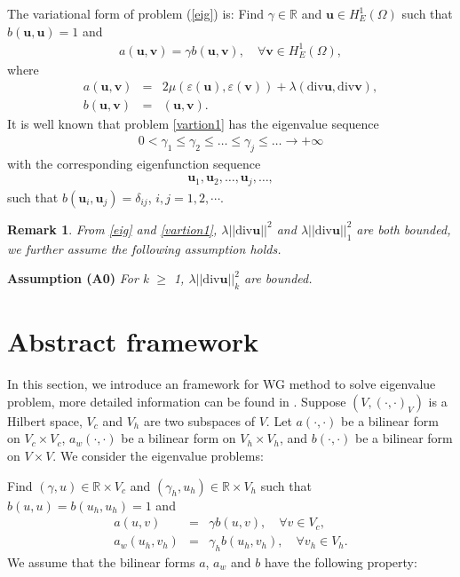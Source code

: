\documentclass[leqno,CJK]{siamltex704}
\numberwithin{equation}{section}
\def\bu{{\mathbf{u}}}
\def\bv{{\mathbf{v}}}
\newtheorem{remark}{Remark}[section]
\newcommand{\eps}{\varepsilon}
\newcommand{\di}{\text{div}}
\newcommand{\Real}{\mathbb{R}}
\begin{document}
The variational form of problem (\ref{eig}) is: Find $\gamma\in\Real$ and $\bu\in H_E^1(\Omega)$ such that $b(\bu,\bu)=1$ and
\begin{eqnarray}\label{vartion1}
	a(\bu,\bv)=\gamma b(\bu,\bv),\quad\forall\bv\in H_E^1(\Omega),
\end{eqnarray}
where
\begin{eqnarray*}
	a(\bu,\bv) &=& 2\mu(\eps(\bu),\eps(\bv))+\lambda(\di\bu,\di\bv),\\
	b(\bu,\bv) &=& (\bu,\bv).
\end{eqnarray*}
It is well known that problem \eqref{vartion1} has the
eigenvalue sequence \cite{MR1115240}
\begin{eqnarray*}
0<\gamma_1\le\gamma_2\le\ldots\le\gamma_j\leq\ldots\longrightarrow +\infty
\end{eqnarray*}
with the corresponding eigenfunction sequence
\begin{eqnarray*}
	\bu_1,\bu_2,\ldots,\bu_j,\ldots,
\end{eqnarray*}
such that $b(\bu_i,\bu_j)=\delta_{ij}$, $i,j=1,2,\cdots$.

\begin{remark}
	From \eqref{eig} and \eqref{vartion1}, $\lambda||\di\bu||^2$ and $\lambda||\di\bu||_1^2$ are both bounded, we further assume the following assumption holds.
\end{remark}

\textbf{Assumption (A0)}\emph{
	For k $\geq$ 1, $\lambda||\text{div}\bu||_k^2$ are bounded.
}
	
\section{Abstract framework}
	In this section, we introduce an framework for WG method to solve eigenvalue problem, more detailed information can be found in \cite{Zhai2019}. Suppose $(V,(\cdot,\cdot)_V)$ is a Hilbert space, $V_c$ and $V_h$ are two
	subspaces of $V$. Let $a(\cdot,\cdot)$ be a bilinear form on $V_c\times V_c$,
	$a_w(\cdot,\cdot)$ be a bilinear form on $V_h\times V_h$, and $b(\cdot,\cdot)$ be a bilinear form on $V\times V$. We consider the eigenvalue problems:
	
	Find $(\gamma,u)\in \Real\times V_c$ and $(\gamma_h,u_h)\in\Real\times V_h$ such
	that $b(u,u)=b(u_h,u_h)=1$ and
	\begin{eqnarray}\label{problem-eq1}
		a(u,v) &=& \gamma b(u,v),\quad\forall v\in V_c,
		\\ \label{problem-eq2}
		a_w(u_h,v_h) &=& \gamma_h b(u_h,v_h),\quad\forall v_h\in V_h.
	\end{eqnarray}
	We assume that the bilinear forms $a$, $a_w$ and $b$ have the following property:
	
\end{document}
